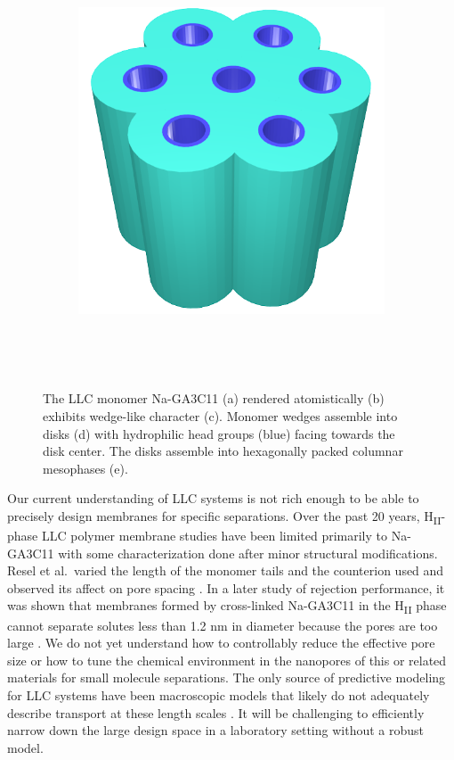 \documentclass[journal=jpcbfk,manusciprt=article]{achemso}
\begin{document}
\begin{figure}
\begin{subfigure}{0.4\linewidth}
		\caption{}~\label{fig:wedge_layer}
	\end{subfigure}
	\begin{subfigure}{0.4\linewidth}
		\centering
		\includegraphics[width=\textwidth]{hexagonal_packing.png}
		\caption{}~\label{fig:hex_packing_simple}
	\end{subfigure}
	\caption{The LLC monomer Na-GA3C11 (a) rendered atomistically (b)
	exhibits wedge-like character (c). Monomer wedges assemble into disks (d) with
	hydrophilic head groups (blue) facing towards the disk center. The disks
	assemble into hexagonally packed columnar mesophases (e).}~\label{fig:assembly}
  \end{figure}

  Our current understanding of LLC systems is not rich enough to be able to
  precisely design membranes for specific separations. Over the past 20 years,
  H\textsubscript{II}-phase LLC polymer membrane studies have been limited
  primarily to Na-GA3C11 with some characterization done after minor structural
  modifications. Resel et al.~varied the length of the monomer tails and the
  counterion used and observed its affect on pore spacing
  \cite{resel_structural_2000}. In a later study of rejection performance, it was
  shown that membranes formed by cross-linked Na-GA3C11 in the
  H\textsubscript{II} phase cannot separate solutes less than 1.2 nm in diameter
  because the pores are too large \cite{zhou_supported_2005}. We do not yet
  understand how to controllably reduce the effective pore size or how to tune
  the chemical environment in the nanopores of this or related materials for
  small molecule separations. The only source of predictive modeling for
  LLC systems have been macroscopic models that likely do not adequately describe
  transport at these length scales \cite{hatakeyama_water_2011}. It will be
  challenging to efficiently narrow down the large design space in a laboratory
  setting without a robust model.
\end{document}
